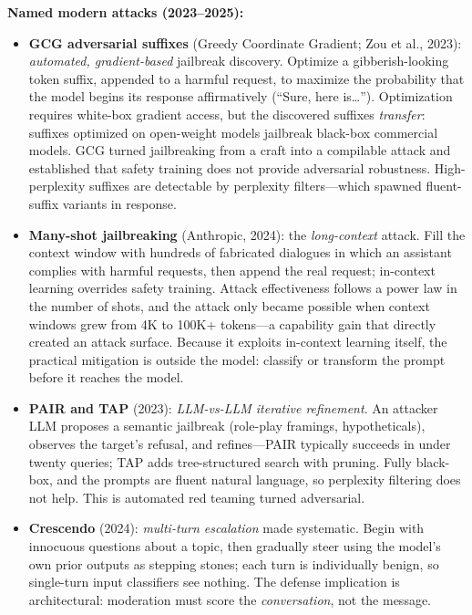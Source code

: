 \textbf{Named modern attacks (2023--2025):}
\begin{itemize}
    \item \textbf{GCG adversarial suffixes} (Greedy Coordinate Gradient; Zou et al., 2023): \textit{automated, gradient-based} jailbreak discovery. Optimize a gibberish-looking token suffix, appended to a harmful request, to maximize the probability that the model begins its response affirmatively (``Sure, here is\ldots''). Optimization requires white-box gradient access, but the discovered suffixes \textit{transfer}: suffixes optimized on open-weight models jailbreak black-box commercial models. GCG turned jailbreaking from a craft into a compilable attack and established that safety training does not provide adversarial robustness. High-perplexity suffixes are detectable by perplexity filters---which spawned fluent-suffix variants in response.
    \item \textbf{Many-shot jailbreaking} (Anthropic, 2024): the \textit{long-context} attack. Fill the context window with hundreds of fabricated dialogues in which an assistant complies with harmful requests, then append the real request; in-context learning overrides safety training. Attack effectiveness follows a power law in the number of shots, and the attack only became possible when context windows grew from 4K to 100K+ tokens---a capability gain that directly created an attack surface. Because it exploits in-context learning itself, the practical mitigation is outside the model: classify or transform the prompt before it reaches the model.
    \item \textbf{PAIR and TAP} (2023): \textit{LLM-vs-LLM iterative refinement}. An attacker LLM proposes a semantic jailbreak (role-play framings, hypotheticals), observes the target's refusal, and refines---PAIR typically succeeds in under twenty queries; TAP adds tree-structured search with pruning. Fully black-box, and the prompts are fluent natural language, so perplexity filtering does not help. This is automated red teaming turned adversarial.
    \item \textbf{Crescendo} (2024): \textit{multi-turn escalation} made systematic. Begin with innocuous questions about a topic, then gradually steer using the model's own prior outputs as stepping stones; each turn is individually benign, so single-turn input classifiers see nothing. The defense implication is architectural: moderation must score the \textit{conversation}, not the message.
\end{itemize}

